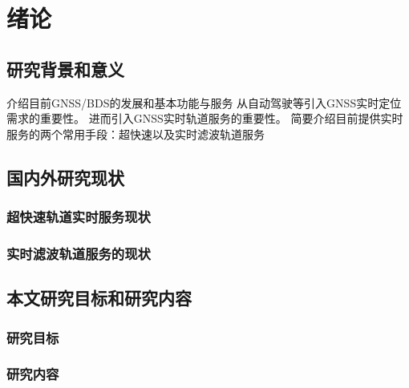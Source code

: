 
\chapter{绪论}
\section{研究背景和意义}
介绍目前GNSS/BDS的发展和基本功能与服务
从自动驾驶等引入GNSS实时定位需求的重要性。
进而引入GNSS实时轨道服务的重要性。
简要介绍目前提供实时服务的两个常用手段：超快速以及实时滤波轨道服务
\section{国内外研究现状}
\subsection{超快速轨道实时服务现状}
\subsection{实时滤波轨道服务的现状}
\section{本文研究目标和研究内容}
\subsection{研究目标}
\subsection{研究内容}